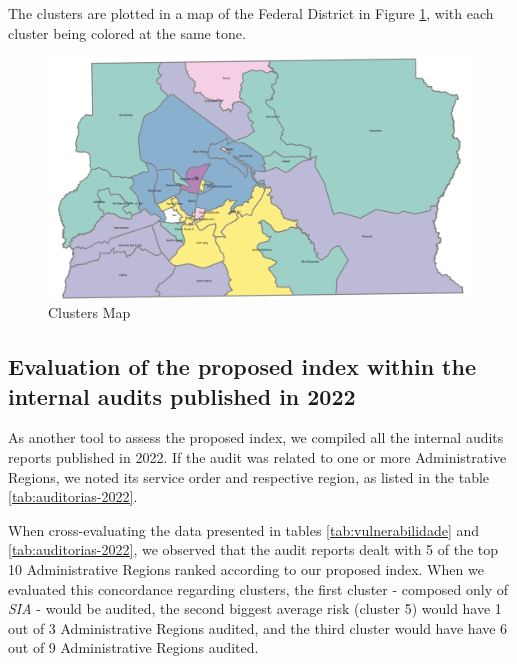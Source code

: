 \documentclass[conference]{IEEEtran}
\begin{document}
The clusters are plotted in a map of the Federal District in Figure \ref{fig:mapa_cluster}, with each cluster being colored at the same tone.


\begin{figure}[htb]
  \centering
  \includegraphics[width=\textwidth]{mapa.png}
  \caption{Clusters Map}
  \label{fig:mapa_cluster}
\end{figure}


\subsection{Evaluation of the proposed index within the internal audits published in 2022}

As another tool to assess the proposed index, we compiled all the internal audits reports published in 2022. If the audit was related to one or more Administrative Regions, we noted its service order and respective region, as listed in the table \ref{tab:auditorias-2022}.

When cross-evaluating the data presented in tables \ref{tab:vulnerabilidade} and \ref{tab:auditorias-2022}, we observed that the audit reports dealt with 5 of the top 10 Administrative Regions ranked according to our proposed index. When we evaluated this concordance regarding clusters, the first cluster - composed only of \textit{SIA} - would be audited, the second biggest average risk (cluster 5) would have 1 out of 3 Administrative Regions audited, and the third cluster would have have 6 out of 9 Administrative Regions audited.
\end{document}
